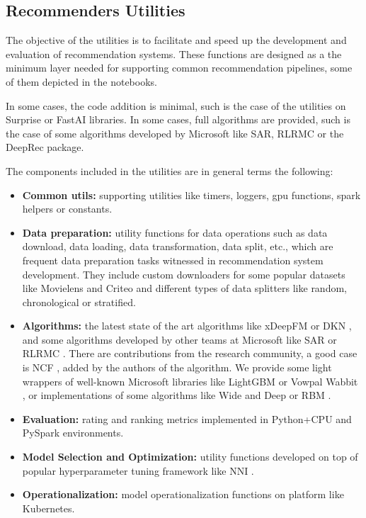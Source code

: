 \subsection{Recommenders Utilities}

The objective of the utilities is to facilitate and speed up the development and evaluation of recommendation systems.
These functions are designed as a the minimum layer needed for supporting common recommendation pipelines, some of 
them depicted in the notebooks. 

In some cases, the code addition is minimal, such is the case of the utilities on Surprise \cite{Surprise} or 
FastAI \cite{howard2018fastai} libraries. In some cases, full algorithms are provided, such is the case of 
some algorithms developed by Microsoft like SAR, RLRMC or the DeepRec package.

The components included in the utilities are in general terms the following: 
\begin{itemize}
    \item \textbf{Common utils:} supporting utilities like timers, loggers, gpu functions, 
    spark helpers or constants.
    \item \textbf{Data preparation:} utility functions for data operations 
    such as data download, data loading, data transformation, data split, etc., which are frequent data preparation 
    tasks witnessed in recommendation system development. They include custom downloaders for some
    popular datasets like Movielens and Criteo and different types of data splitters like random, chronological or
    stratified.     
    \item \textbf{Algorithms:} the latest state of
    the art algorithms like xDeepFM \cite{lian2018xdeepfm} or DKN \cite{wang2018dkn}, and some algorithms developed by other
    teams at Microsoft like SAR \cite{diev2015sar} or RLRMC \cite{rlrmc}. There are contributions from the research community, a good case is NCF 
    \cite{he2017neural}, added by the authors of the algorithm. We provide some light wrappers of well-known Microsoft
    libraries like LightGBM \cite{ke2017lightgbm} or Vowpal Wabbit \cite{agarwal2014reliable}, or implementations
    of some algorithms like Wide and Deep \cite{cheng2016wide} or RBM \cite{salakhutdinov2007restricted}. 
    \item \textbf{Evaluation:} rating and ranking metrics implemented in Python+CPU and PySpark environments.
    \item \textbf{Model Selection and Optimization:} utility functions developed on top of popular hyperparameter 
    tuning framework like NNI \cite{nni}. 
    \item \textbf{Operationalization:} model operationalization functions on platform like Kubernetes.
\end{itemize}
    

